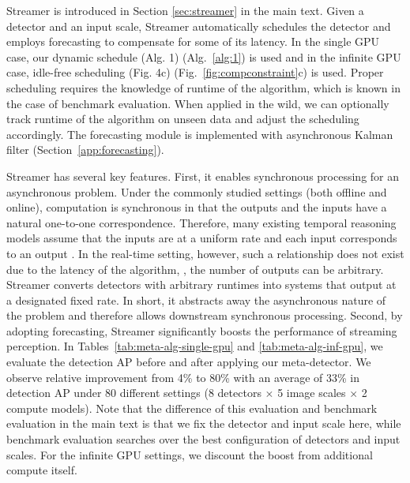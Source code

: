 Streamer is introduced in Section
\else
    \ref{sec:streamer}
\fi
in the main text. Given a detector and an input scale, Streamer automatically schedules the detector and employs forecasting to compensate for some of its latency. In the single GPU case, our dynamic schedule
\ifstandalonesupplement
    (Alg. 1)
\else
    (Alg.~\ref{alg:1})
\fi
is used and in the infinite GPU case, idle-free scheduling
\ifstandalonesupplement
    (Fig. 4c)
\else
    (Fig.~\ref{fig:compconstraint}c)
\fi
is used. Proper scheduling requires the knowledge of runtime of the algorithm, which is known in the case of benchmark evaluation. When applied in the wild, we can optionally track runtime of the algorithm on unseen data and adjust the scheduling accordingly. The forecasting module is implemented with asynchronous Kalman filter (Section~\ref{app:forecasting}).

Streamer has several key features. First, it enables synchronous processing for an asynchronous problem. Under the commonly studied settings (both offline and online), computation is synchronous in that the outputs and the inputs have a natural one-to-one correspondence. Therefore, many existing temporal reasoning models assume that the inputs are at a uniform rate and each input corresponds to an output \cite{Donahue2015LongtermRC,Girdhar2018ABB,Feichtenhofer2019SlowFastNF}. In the real-time setting, however, such a relationship does not exist due to the latency of the algorithm, \ie, the number of outputs can be arbitrary. Streamer converts detectors with arbitrary runtimes into systems that output at a designated fixed rate. In short, it abstracts away the asynchronous nature of the problem and therefore allows downstream synchronous processing. Second, by adopting forecasting, Streamer significantly boosts the performance of streaming perception. In Tables~\ref{tab:meta-alg-single-gpu} and \ref{tab:meta-alg-inf-gpu}, we evaluate the detection AP before and after applying our meta-detector. We observe relative improvement from 4\% to 80\% with an average of 33\% in detection AP under 80 different settings (8 detectors $\times$ 5 image scales $\times$ 2 compute models). Note that the difference of this evaluation and benchmark evaluation in the main text is that we fix the detector and input scale here, while benchmark evaluation searches over the best configuration of detectors and input scales. For the infinite GPU settings, we discount the boost from additional compute itself.











